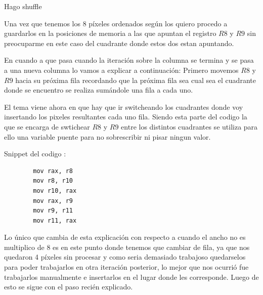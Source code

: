 Hago shuffle 



Una vez que tenemos los 8 píxeles ordenados según los quiero procedo a guardarlos en la posiciones de memoria a las que apuntan el registro $R8$ y $R9$ sin preocuparme en este caso del cuadrante donde estos dos estan apuntando.

En cuando a que pasa cuando la iteración sobre la columna se termina y se pasa a una nueva columna lo vamos a explicar a continuación:
Primero movemos $R8$ y $R9$ hacia su próxima fila recordando que la próxima fila sea cual sea el cuadrante donde se encuentro se realiza sumándole una fila a cada uno.

El tema viene ahora en que hay que ir switcheando los cuadrantes donde voy insertando los pixeles resultantes cada uno fila. Siendo esta parte del codigo la que se encarga de swtichear $R8$ y $R9$ entre los distintos cuadrantes se utiliza para ello una variable puente para no sobrescribir ni pisar ningun valor. 

Snippet del codigo :

\begin{lstlisting}
		mov rax, r8
		mov r8, r10
		mov r10, rax
		mov rax, r9
		mov r9, r11
		mov r11, rax
\end{lstlisting}

Lo único que cambia de esta explicación con respecto a cuando el ancho no es multiplico de 8 es en este punto donde tenemos que cambiar de fila, ya que nos quedaron 4 píxeles sin procesar y como seria demasiado trabajoso quedarselos para poder trabajarlos en otra iteración posterior, lo mejor que nos ocurrió fue trabajarlos manualmente e insertarlos en el lugar donde les corresponde. Luego de esto se sigue con el paso recién explicado.



